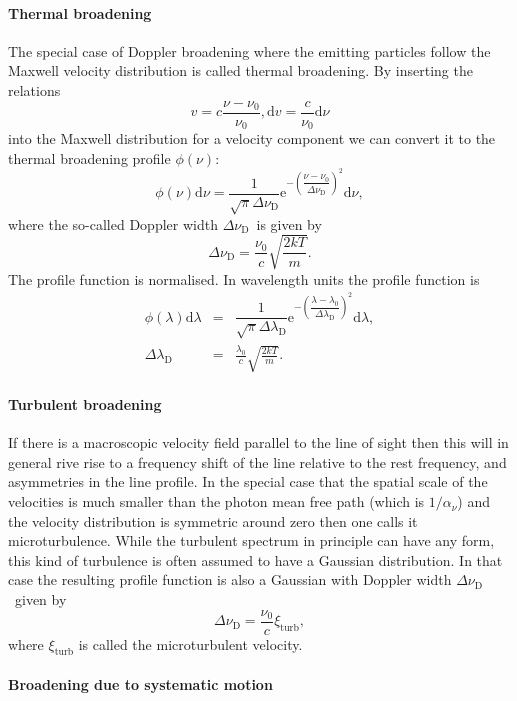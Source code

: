 \documentclass[12pt]{article}
\numberwithin{equation}{section}
\def\exp{\mathrm{e}}
\def\dd{\mathrm{d}}
\def\anu{\ensuremath{\alpha_{\nu}}}
\def\dnud{\ensuremath{\Delta \nu_\mathrm{D}}}
\def\dlad{\ensuremath{\Delta \lambda_\mathrm{D}}}
\newcommand{\be}{\begin{equation}}
\newcommand{\ee}{\end{equation}}
\newcommand{\bea}{\begin{eqnarray}}
\newcommand{\eea}{\end{eqnarray}}
\begin{document}
\paragraph{Thermal broadening}
The special case of Doppler broadening where the emitting particles follow the Maxwell velocity distribution is called thermal broadening. By inserting the relations 
\be
v = c \frac{\nu-\nu_0}{\nu_0}, \dd v = \frac{c}{\nu_0} \dd \nu
\ee
into the Maxwell distribution for a velocity component we can convert it to the thermal broadening profile $\phi(\nu)$:
\be
\phi(\nu) \dd \nu = \dfrac{1}{ \sqrt{\pi} \dnud } \exp^{-\left( \dfrac{\nu-\nu_0}{\dnud} \right)^2} \dd \nu,
\ee
where the so-called Doppler width \dnud\ is given by
\be
\dnud = \frac{\nu_0}{c} \sqrt{\frac{2kT}{m}}.
\ee
The profile function is normalised. In wavelength units the profile function is
\bea
\phi(\lambda) \dd \lambda &=& \dfrac{1}{ \sqrt{\pi} \dlad } \exp^{-\left( \dfrac{\lambda-\lambda_0}{\dlad} \right)^2} \dd \lambda, \\
\dlad &=& \frac{\lambda_0}{c} \sqrt{\frac{2kT}{m}}.
\eea

\paragraph{Turbulent broadening}
If there is a macroscopic velocity field parallel to the line of sight then this will in general rive rise to a frequency shift of the line relative to the rest frequency, and asymmetries in the line profile. In the special case that the spatial scale of the velocities is much smaller than the photon mean free path (which is $1/\anu$) and the velocity distribution is symmetric around zero then one calls it microturbulence. While the turbulent spectrum in principle can have any form, this kind of turbulence is often assumed to have a Gaussian distribution. In that case the resulting profile function is also a Gaussian with Doppler width \dnud\ given by
\be
\dnud = \frac{\nu_0}{c} \xi_\mathrm{turb},
\ee
where $\xi_\mathrm{turb}$ is called the microturbulent velocity.

\paragraph{Broadening due to systematic motion}
\end{document}
